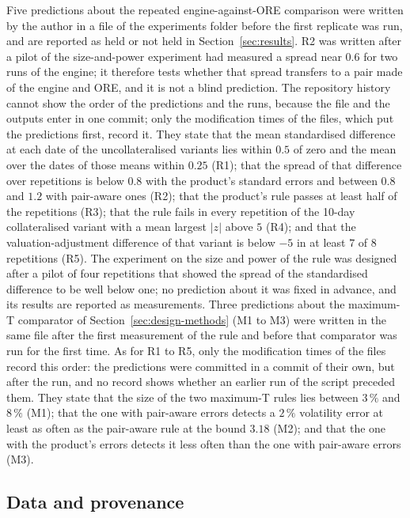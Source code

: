 Five predictions about the repeated engine-against-ORE comparison were written by the author in a file of the experiments folder before the first replicate was run, and are reported as held or not held in Section~\ref{sec:results}. R2 was written after a pilot of the size-and-power experiment had measured a spread near $0.6$ for two runs of the engine; it therefore tests whether that spread transfers to a pair made of the engine and ORE, and it is not a blind prediction. The repository history cannot show the order of the predictions and the runs, because the file and the outputs enter in one commit; only the modification times of the files, which put the predictions first, record it. They state that the mean standardised difference at each date of the uncollateralised variants lies within $0.5$ of zero and the mean over the dates of those means within $0.25$ (R1); that the spread of that difference over repetitions is below $0.8$ with the product's standard errors and between $0.8$ and $1.2$ with pair-aware ones (R2); that the product's rule passes at least half of the repetitions (R3); that the rule fails in every repetition of the 10-day collateralised variant with a mean largest $\lvert z\rvert$ above $5$ (R4); and that the valuation-adjustment difference of that variant is below $-5$ in at least $7$ of $8$ repetitions (R5). The experiment on the size and power of the rule was designed after a pilot of four repetitions that showed the spread of the standardised difference to be well below one; no prediction about it was fixed in advance, and its results are reported as measurements. Three predictions about the maximum-T comparator of Section~\ref{sec:design-methods} (M1 to M3) were written in the same file after the first measurement of the rule and before that comparator was run for the first time. As for R1 to R5, only the modification times of the files record this order: the predictions were committed in a commit of their own, but after the run, and no record shows whether an earlier run of the script preceded them. They state that the size of the two maximum-T rules lies between $3\,\%$ and $8\,\%$ (M1); that the one with pair-aware errors detects a $2\,\%$ volatility error at least as often as the pair-aware rule at the bound $3.18$ (M2); and that the one with the product's errors detects it less often than the one with pair-aware errors (M3).

\subsection{Data and provenance}
\label{sec:design-data}

